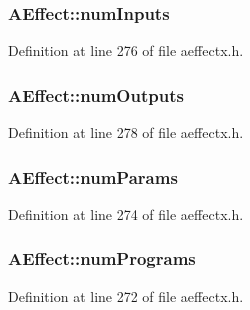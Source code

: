 \subsubsection[{\texorpdfstring{num\+Inputs}{numInputs}}]{ A\+Effect\+::num\+Inputs}\hypertarget{class_a_effect_a2664ad3fdd5f3ae476f183bf453744bf}{}\label{class_a_effect_a2664ad3fdd5f3ae476f183bf453744bf}


Definition at line 276 of file aeffectx.\+h.

\subsubsection[{\texorpdfstring{num\+Outputs}{numOutputs}}]{ A\+Effect\+::num\+Outputs}\hypertarget{class_a_effect_a11d3a0c5805abeed61b74e56a2b0cb24}{}\label{class_a_effect_a11d3a0c5805abeed61b74e56a2b0cb24}


Definition at line 278 of file aeffectx.\+h.

\subsubsection[{\texorpdfstring{num\+Params}{numParams}}]{ A\+Effect\+::num\+Params}\hypertarget{class_a_effect_a0e5ed85d0d00ebec2eac117079e0086b}{}\label{class_a_effect_a0e5ed85d0d00ebec2eac117079e0086b}


Definition at line 274 of file aeffectx.\+h.

\subsubsection[{\texorpdfstring{num\+Programs}{numPrograms}}]{ A\+Effect\+::num\+Programs}\hypertarget{class_a_effect_a57c21fba27c94b3c123abd21b1bef16f}{}\label{class_a_effect_a57c21fba27c94b3c123abd21b1bef16f}


Definition at line 272 of file aeffectx.\+h.


